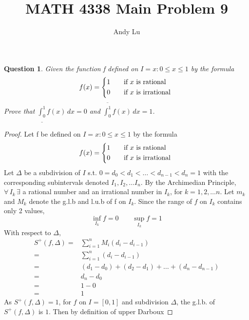 \documentclass{article}
\title{MATH 4338 Main Problem 9}
\date{}
\author{Andy Lu}
\newtheorem*{theorem}{Question}
\begin{document}
  \maketitle
  \begin{theorem}
    Given the function f defined on $I = {x: 0 \leq x \leq 1}$ by the formula
    \[
      f(x) =
      \begin{cases*}
        1 \quad& if $x$ is rational \\
        0 \quad& if $x$ is irrational
      \end{cases*}\]
      Prove that $\underline{\int_{0}^{1}}f(x) \, dx = 0$ and 
      $\overline{\int_{0}^{1}}f(x) \, dx = 1$.
  \end{theorem}
  \begin{proof}
    Let f be defined on $I = {x: 0 \leq x \leq 1}$ by the formula
    \[
      f(x) =
      \begin{cases*}
        1 \quad& if $x$ is rational \\
        0 \quad& if $x$ is irrational
      \end{cases*}\]
    Let $\Delta$ be a subdivision of $I$ s.t. 
    $0 = d_0 < d_1 < \ldots < d_{n-1} < d_n = 1$ with the corresponding 
    subintervals denoted $I_1, I_2, \ldots I_n$.
    By the Archimedian Principle, 
    $\forall \, I_k \, \exists$ a rational number and an irrational number in
    $I_k$, for $k = 1,2,\ldots n$. Let $m_k$ and $M_k$ denote the g.l.b and
     l.u.b of f on $I_k$. Since the range of $f$ on $I_k$ contains only 2
    values,
    \begin{equation}
      \inf_{I_k}f = 0 \qquad \sup_{I_k} f = 1
    \end{equation}
    With respect to $\Delta$,
    \begin{align*}
      S^{+}(f,\Delta) =& \sum_{i=1}^{n} M_{i}(d_i - d_{i-1})
      \tag{by definition of Upper Darboux Sum}\\
      =& \sum_{i=1}^{n} (d_i - d_{i-1}) \tag{since $M_i = 1$}\\
      =& (d_1 - d_0) + (d_2 - d_1) + \ldots + (d_n - d_{n-1})
      \tag{by definition of sum}\\
      =& d_n - d_0 \tag{by combining like terms} \\
      =& 1- 0 \tag{by construction of $\Delta$} \\
      =& 1 
    \end{align*}
    As $S^{+}(f,\Delta) = 1$, for $f$ on $I=[0,1]$ and subdivision $\Delta$, the
    g.l.b. of $S^{+}(f,\Delta)$ is $1$. Then by definition of upper Darboux

\end{proof}
\end{document}
